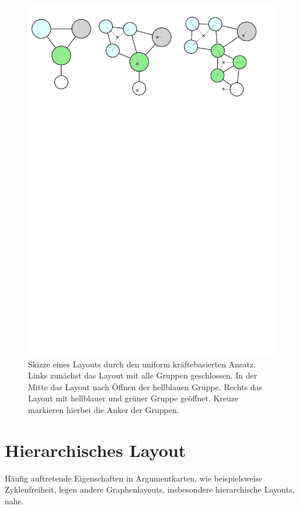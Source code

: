 \begin{figure}[h!]
\begin{center}
	\includegraphics[width=\textwidth]{Pics/uniform_kb.pdf}
	\caption{Skizze eines Layouts durch den uniform kräftebasierten Ansatz. Links zunächst das Layout mit alle Gruppen geschlossen. In der Mitte das Layout nach Öffnen der hellblauen Gruppe. Rechts das Layout mit hellblauer und grüner Gruppe geöffnet. Kreuze markieren hierbei die Anker der Gruppen.}
	\label{UniformK-Skizze}
\end{center}
\end{figure}


\section{Hierarchisches Layout}
\label{Hierarch-Ansatz}
Häufig auftretende Eigenschaften in Argumentkarten, wie beispielsweise Zyklenfreiheit, legen andere Graphenlayouts, insbesondere hierarchische Layouts, nahe.

